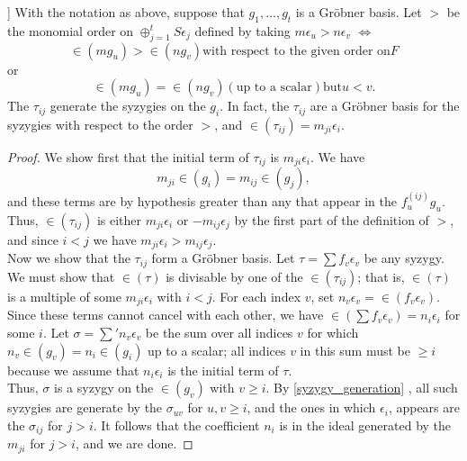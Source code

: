 \documentclass{article}
\begin{document}
\begin{thm}[Schreyer \cite{Eis1}[15.10]]
	With the notation as above, suppose that 
	\( g_1,\dots,g_t\)
	is a Gr\"obner basis.
	Let \( > \) be the monomial order on 
	\( \oplus_{j=1}^t S \epsilon_{j} \)
	defined by taking 
	\( m \epsilon_{u} > n \epsilon_{v} \)
	\(\iff\)
	\[
		\in\left(  m g_{u} \right) > \in\left( n g_{v} \right) 
		\text{with respect to the given order on} F 
	\]
	or
	\[
		\in\left( m g_{u} \right) = \in\left( n g_{v} \right) 
		\left( \text{up to a scalar} \right) \text{but} u < v.
	\]
	The 
	\( \tau_{ij} \)
	generate the syzygies on the 
	\( g_{i} \).
	In fact, the 
	\( \tau_{ij} \)
	are a Gr\"obner basis for the syzygies with respect to the order \( > \),
	and 
	\( \in\left( \tau_{ij} \right) = m_{ji}\epsilon_{i}.\)
\end{thm}
\begin{proof}
	We show first that the initial term of 
	\( \tau_{ij} \)
	is 
	\( m_{ji} \epsilon_{i} \). We have
	\[
		m_{ji} \in \left( g_{i} \right) = m_{ij} \in \left( g_{j} \right),
	\]
	and these terms are by hypothesis greater than any that appear in the
	\( f_{u}^{\left( ij \right)} g_{u} .\)
	Thus, 
	\( \in\left( \tau_{ij} \right) \)
	is either 
	\( m_{ji} \epsilon_{i} \)
	or 
	\( -m_{ij}\epsilon_{j} \)
	by the first part of the definition of 
	\( > \),
	and since 
	\( i < j \) 
	we have 
	\( m_{ji} \epsilon_{i} > m_{ij}\epsilon_{j} .\) \\
	Now we show that the 
	\( \tau_{ij} \)
	form a Gr\"obner basis. 
	Let 
	\( \tau = \sum f_{v} \epsilon_{v}\)
	be any syzygy.
	We must show that
	\( \in\left( \tau \right) \)
	is divisable by one of the 
	\( \in\left( \tau_{ij} \right)\);
	that is,
	\( \in\left( \tau \right) \)
	is a multiple of some 
	\( m_{ji} \epsilon_{i} \)
	with
	\( i<j \).
	For each index 
	\(v \),
	set 
	\(n_{v} \epsilon_{v}=\in\left( f_{v}\epsilon_{v} \right) \).
	Since these terms cannot cancel with each other,
	we have 
	\( \in\left( \sum f_{v}\epsilon_{v} \right)=n_{i}\epsilon_{i}\)
	for some
	\( i\).
	Let 
	\( \sigma=\sum'n_{v} \epsilon_{v} \)
	be the sum over all indices
	\( v \) 
	for which 
	\( n_v \in \left( g_{v} \right)=n_{i} \in\left( g_{i} \right) \)
	up to a scalar;
	all indices 
	\( v \)
	in this sum must be 
	\( \ge i \)
	because we assume that 
	\( n_{i} \epsilon_{i} \)
	is the initial term of 
	\( \tau \). \\
	Thus,
	\( \sigma \) 
	is a syzygy on the 
	\( \in\left( g_{v} \right) \)
	with 
	\( v \ge i\).
	By \ref{syzygy_generation} ,
	all such syzygies are generate by the
	\( \sigma_{uv} \)
	for
	\( u,v \ge i \),
	and the ones in which
	\( \epsilon_{i} \),
	appears are the 
	\( \sigma_{ij}\)
	for 
	\( j > i \).
	It follows that the coefficient
	\(n_{i}\)
	is in the ideal generated by the 
	\(m_{ji}\)
	for 
	\( j> i \), 
	and we are done.
\end{proof}

\end{document}
